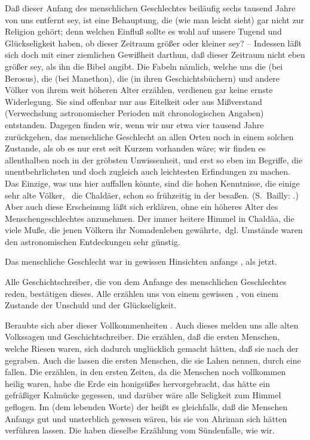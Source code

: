 \begin{aufza}
\begin{RWanm}
Daß dieser Anfang des menschlichen Geschlechtes beiläufig sechs tausend Jahre von uns entfernt sey, ist eine Behauptung, die (wie man leicht sieht) gar nicht zur Religion gehört; denn welchen Einfluß sollte es wohl auf unsere Tugend und Glückseligkeit haben, ob dieser Zeitraum größer oder kleiner sey? -- Indessen läßt sich doch mit einer ziemlichen Gewißheit darthun, daß dieser Zeitraum nicht eben größer sey, als ihn die Bibel angibt. Die Fabeln nämlich, welche uns die  (bei Berosus), die  (bei Manethon), die  (in ihren Geschichtsbüchern) und andere Völker von ihrem weit höheren Alter erzählen, verdienen gar keine ernste Widerlegung. Sie sind offenbar nur aus Eitelkeit oder aus Mißverstand (Verwechslung astronomischer Perioden mit chronologischen Angaben) entstanden. Dagegen finden wir, wenn wir nur etwa vier tausend Jahre zurückgehen, das menschliche Geschlecht an allen Orten noch in einem solchen Zustande, als ob es nur erst seit Kurzem vorhanden wäre; wir finden es allenthalben noch in der gröbsten Unwissenheit, und erst so eben im Begriffe, die unentbehrlichsten und doch zugleich auch leichtesten Erfindungen zu machen. Das Einzige, was uns hier auffallen könnte, sind die hohen Kenntnisse, die einige sehr alte Völker, \zB\ die Chaldäer, schon so frühzeitig in der  besaßen. (S.~Bailly: .) Aber auch diese Erscheinung läßt sich erklären, ohne ein höheres Alter des Menschengeschlechtes anzunehmen. Der immer heitere Himmel in Chaldäa, die viele Muße, die jenen Völkern ihr Nomadenleben gewährte, \ua\,dgl. Umstände waren den astronomischen Entdeckungen sehr günstig.
\end{RWanm}
\item Das menschliche Geschlecht war in gewissen Hinsichten anfangs , als jetzt.~\par 
Alle Geschichtschreiber, die von dem Anfange des menschlichen Geschlechtes reden, bestätigen dieses. Alle erzählen uns von einem gewissen , von einem Zustande der Unschuld und der Glückseligkeit.
\item Beraubte sich aber dieser Vollkommenheiten . Auch dieses melden uns alle alten Volkssagen und Geschichtschreiber. Die  erzählen, daß die ersten Menschen, welche Riesen waren, sich dadurch unglücklich gemacht hätten, daß sie nach der  gegraben. Auch die  lassen die ersten Menschen, die sie Lahen nennen, durch eine  fallen. Die  erzählen, in den ersten Zeiten, da die Menschen noch vollkommen heilig waren, habe die Erde ein honigsüßes  hervorgebracht, das hätte ein gefräßiger Kalmücke gegessen, und darüber wäre alle Seligkeit zum Himmel geflogen. Im  (dem lebenden Worte) der  heißt es gleichfalls, daß die Menschen Anfangs gut und unsterblich gewesen wären, bis sie von Ahriman sich hätten verführen lassen. Die  haben dieselbe Erzählung vom Sündenfalle, wie wir. \usw\
\end{aufza}
